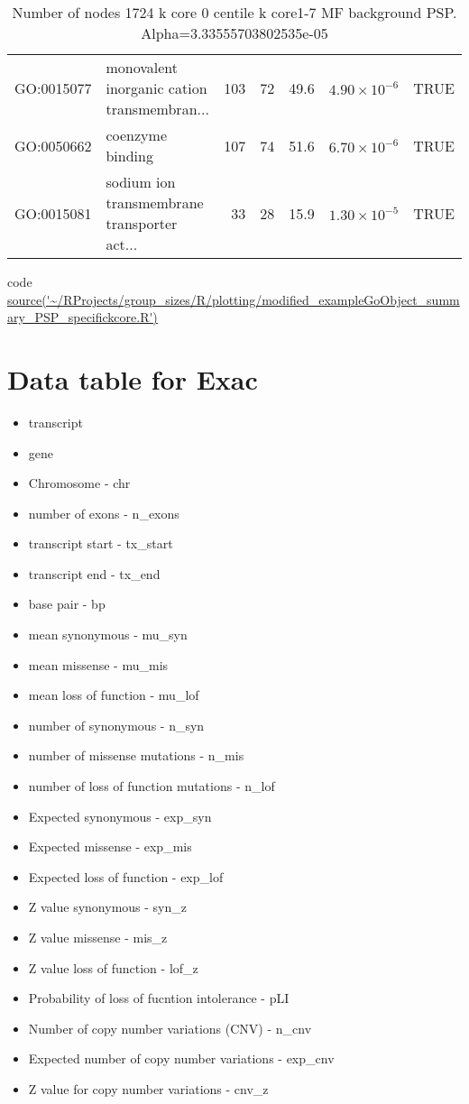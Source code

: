 \begin{table}[ht]
\begin{tabular}{llrrrrl}
  GO:0015077 & monovalent inorganic cation transmembran... & 103 & 72 & 49.6 & $4.90 \times 10^{-6}$ & TRUE \\ 
  GO:0050662 & coenzyme binding & 107 & 74 & 51.6 & $6.70 \times 10^{-6}$ & TRUE \\ 
  GO:0015081 & sodium ion transmembrane transporter act... & 33 & 28 & 15.9 & $1.30 \times 10^{-5}$ & TRUE \\ 
   \hline
\end{tabular}
\caption{Number of nodes 1724 k core 0 centile  k core1-7 MF background PSP. Alpha=3.33555703802535e-05} 
\label{tab:kcore range GO Number of nodes 1724 k core 0 centile  k core1-7 MF background PSP. Alpha=3.33555703802535e-05}
\end{table}

code \url{source('~/RProjects/group_sizes/R/plotting/modified_exampleGoObject_summary_PSP_specifickcore.R')}

\section{Data table for Exac}
\label{sec:supplemental data table for exac}
\begin{itemize}
    \item { transcript}
    \item{gene}
    \item{Chromosome - chr}
    \item{number of exons - n\_exons}
    \item{transcript start - tx\_start}
    \item{transcript end - tx\_end}
    \item{base pair - bp}
    \item{mean synonymous - mu\_syn}
    \item{mean missense - mu\_mis}
    \item{mean loss of function - mu\_lof}
    \item{number of synonymous - n\_syn}
    \item{number of missense mutations - n\_mis}
    \item{number of loss of function mutations - n\_lof}
    \item{Expected synonymous - exp\_syn}
    \item{Expected missense - exp\_mis}
    \item{Expected loss of function - exp\_lof}
    \item{Z value synonymous - syn\_z}
    \item{Z value missense - mis\_z}
    \item{Z value loss of function - lof\_z}
    \item{Probability of loss of fucntion intolerance - pLI}
    \item{Number of copy number variations (CNV) - n\_cnv}
    \item{Expected number of copy number variations - exp\_cnv}
    \item{Z value for copy number variations - cnv\_z}
    
\end{itemize}

